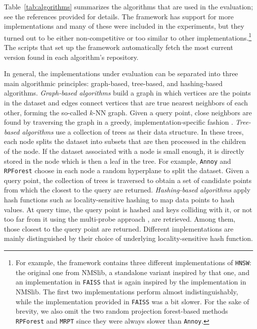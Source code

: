 Table~\ref{tab:algorithms} summarizes the algorithms that are used in the evaluation; see the references provided for details. The framework has support for more implementations and many of these were included 
in the experiments, but they
turned out to be either non-competitive or too similar to other implementations.\footnote{For example, the framework contains three different 
implementations of \texttt{HNSW}: the original one from NMSlib, a standalone variant inspired by that one, and an implementation in \texttt{FAISS} that is 
again inspired by the implementation in NMSlib. The first two implementations perform almost indistinguishably, while the implementation provided in \texttt{FAISS} was a bit slower. For the sake of brevity, we also omit the two random projection forest-based methods \texttt{RPForest} and \texttt{MRPT} since they were always slower than \texttt{Annoy}. } The scripts that set up the framework automatically fetch the most current version found in each algorithm's repository.

In general, the implementations under evaluation can be separated into three main algorithmic principles: graph-based, tree-based, and hashing-based algorithms. \emph{Graph-based algorithms} build a graph in which vertices are the points in the dataset and edges connect vertices that are true nearest neighbors of each other, forming the so-called $k$-NN graph. Given a query point, close neighbors are found by traversing the graph in a greedy, implementation-specific fashion \cite{kgraph,swgraph,hnsw,pynndescent,Iwasaki16}.
\emph{Tree-based
algorithms} use a collection of trees as their data structure. In these trees, each node splits the dataset into subsets that are then processed in the children of the node. If the dataset associated with a node is small enough, it is directly stored in the node which is then a leaf in the tree.  For example, \texttt{Annoy} \cite{annoy} and \texttt{RPForest} \cite{rpforest} choose in each node a random hyperplane to split the dataset. Given a query point, the collection of trees is traversed to obtain a set of
candidate points from which the closest to the query are returned. \emph{Hashing-based algorithms} apply hash functions such as locality-sensitive hashing \cite{IndykM98} to map data points to hash values. At query time, the query point is hashed and keys colliding with it, or not too far from it using the
multi-probe approach \cite{mplsh}, are retrieved. Among them, those closest to the query point are returned. Different implementations are mainly distinguished by their choice of underlying locality-sensitive hash function.

